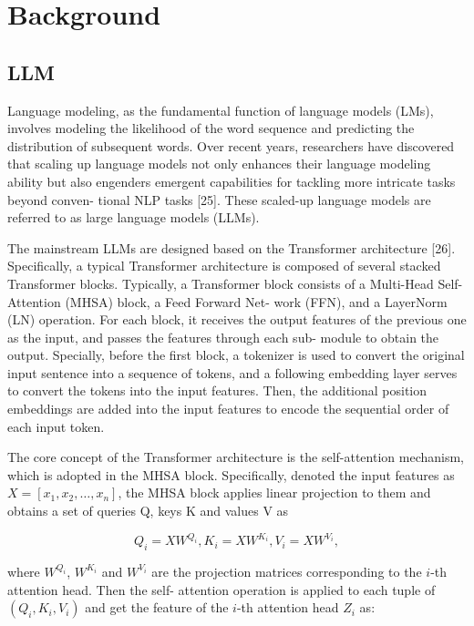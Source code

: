 \section{Background}

\subsection{LLM}

Language modeling, as the fundamental function of language models (LMs), involves modeling the likelihood of
the word sequence and predicting the distribution of subsequent words. Over recent years, researchers have discovered
that scaling up language models not only enhances their
language modeling ability but also engenders emergent
capabilities for tackling more intricate tasks beyond conven-
tional NLP tasks [25]. These scaled-up language models are
referred to as large language models (LLMs).

The mainstream LLMs are designed based on the Transformer architecture [26]. Specifically, a typical Transformer architecture is composed of several stacked Transformer
blocks. Typically, a Transformer block consists of a Multi-Head Self-Attention (MHSA) block, a Feed Forward Net-
work (FFN), and a LayerNorm (LN) operation. For each
block, it receives the output features of the previous one
as the input, and passes the features through each sub-
module to obtain the output. Specially, before the first block,
a tokenizer is used to convert the original input sentence
into a sequence of tokens, and a following embedding layer
serves to convert the tokens into the input features. Then,
the additional position embeddings are added into the input
features to encode the sequential order of each input token.

The core concept of the Transformer architecture is the
self-attention mechanism, which is adopted in the MHSA
block. Specifically, denoted the input features as $X=[x_1,x_2,\dots,x_n]$, the MHSA block applies linear projection to
them and obtains a set of queries Q, keys K and values V as

\begin{equation*}
    Q_i=XW^{Q_i}, K_i=XW^{K_i}, V_i=XW^{V_i},
\end{equation*}

where $W^{Q_i}$, $W^{K_i}$ and $W^{V_i}$ are the projection matrices
corresponding to the $i$-th attention head. Then the self-
attention operation is applied to each tuple of $(Q_i,K_i,V_i)$ and get the feature of the $i$-th attention head $Z_i$ as:

